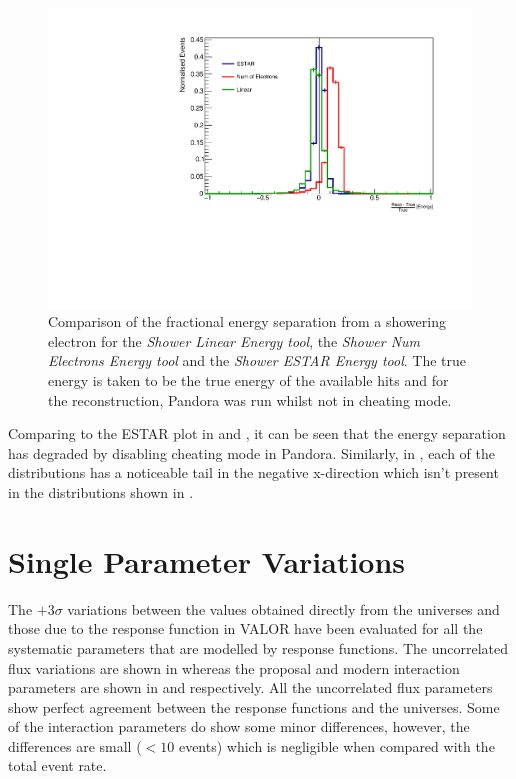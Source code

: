 \begin{figure}[h!]
	\centering
	\includegraphics[width = \largefigwidth]{figures-chap4/non_cheat/ESTAR_plane2_frac_res.pdf}
	\caption[Fractional separation of the shower energy with Pandora being run not in cheating mode.]{Comparison of the fractional energy separation from a showering electron for the \textit{Shower Linear Energy tool}, the \textit{Shower Num Electrons Energy tool} and the \textit{Shower ESTAR Energy tool}. The true energy is taken to be the true energy of the available hits and for the reconstruction, Pandora was run whilst not in cheating mode.}
	\label{fig:frac_res_no_cheat}
\end{figure}

Comparing  to the ESTAR plot in  and , it can be seen that the energy separation has degraded by disabling cheating mode in Pandora. Similarly, in , each of the distributions has a noticeable tail in the negative x-direction which isn't present in the distributions shown in .


\chapter{Single Parameter Variations}\label{app:single_parameter_variations}

The $+3\sigma$ variations between the values obtained directly from the universes and those due to the response function in VALOR have been evaluated for all the systematic parameters that are modelled by response functions. The uncorrelated flux variations are shown in  whereas the proposal and modern interaction parameters are shown in  and  respectively. All the uncorrelated flux parameters show perfect agreement between the response functions and the universes. Some of the interaction parameters do show some minor differences, however, the differences are small ($<10$ events) which is negligible when compared with the total event rate. 

